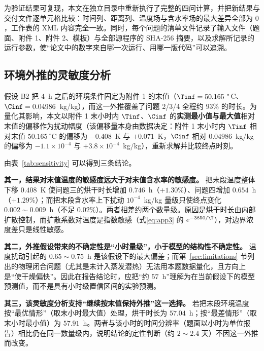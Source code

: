 为验证结果可复现，本文在独立目录中重新执行了完整的四问计算，并把新结果与交付文件逐单元格比较：时间列、距离列、温度场与含水率场的最大差异全部为 $0$，工作表的 XML 内容完全一致。同时，每个问题的清单文件记录了输入文件（题面、附件 1、附件 2、模板）与全部源程序的 SHA-256 摘要，以及求解所记录的运行参数，使``论文中的数字来自哪一次运行、用哪一版代码''可以追溯。

\subsection{环境外推的灵敏度分析}
\label{sec:sensitivity}

假设 B2 把 $4$~h 之后的环境条件固定为附件 1 的末值（$\Tinf=50.165~^\circ$C、$\Cinf=0.04986$~kg/kg），而这一外推覆盖了问题 2/3/4 全程约 $93\%$ 的时长。为量化其影响，本文以附件 1 末小时内 $\Tinf$、$\Cinf$ 的\textbf{实测最小值与最大值}相对末值的偏移作为扰动幅度（该偏移量本身由数据决定：附件 1 末小时内 $\Tinf$ 相对末值 $50.165~^\circ$C 的偏移为 $-0.408$~K 与 $+0.071$~K，$\Cinf$ 相对 $0.04986$~kg/kg 的偏移为 $-1.1\times10^{-4}$ 与 $+3.8\times10^{-4}$~kg/kg），重新求解并比较终点时刻。


由表~\ref{tab:sensitivity} 可以得到三条结论。

\textbf{其一，结果对末值温度的敏感度远大于对末值含水率的敏感度。} 把末段温度整体下移 $0.408$~K 使问题三的烘干时长增加 $0.746$~h（$+1.30\%$）、问题四增加 $0.654$~h（$+1.29\%$）；而把末段含水率上下扰动 $10^{-4}$~kg/kg 量级只使终点变化 $0.002\sim0.009$~h（不足 $0.02\%$）。两者相差约两个数量级。原因是烘干时长由内部扩散控制，而扩散系数对温度是指数敏感（式\eqref{eq:app3} 的 $e^{-3850/\T}$），对边界浓度差只是线性敏感。

\textbf{其二，外推假设带来的不确定性是``小时量级''，小于模型的结构性不确定性。} 温度扰动引起的 $0.65\sim0.75$~h 是该假设下的最大偏差；而第~\ref{sec:limitations} 节列出的物理闭合问题（尤其是未计入蒸发潜热）无法用本题数据量化，且方向上是``使干燥偏快''。因此在报告结论时，应把``约 $57$~h''理解为在当前假设下的模型预测值，而不是具有小时级置信区间的实验预测。

\textbf{其三，该灵敏度分析支持``继续按末值保持外推''这一选择。} 若把末段环境温度按``最优情形''（取末小时最大值）处理，烘干时长为 $57.04$~h；按``最差情形''（取末小时最小值）为 $57.91$~h。两者与该小时的时间分辨率（题面以小时为单位报告）相比仍在同一数量级内，说明结论的定性判断（约 $2\sim2.4$ 天）不因这一外推而改变。

